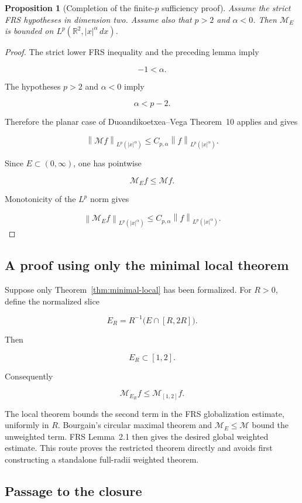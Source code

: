 \documentclass[11pt,a4paper]{article}
\newtheorem{proposition}[theorem]{Proposition}
\theoremstyle{definition}
\theoremstyle{remark}
\newcommand{\R}{\mathbb{R}}
\newcommand{\M}{\mathcal{M}}
\newcommand{\norm}[1]{\left\lVert #1\right\rVert}
\newcommand{\abs}[1]{\left\lvert #1\right\rvert}
\begin{document}
\begin{proposition}[Completion of the finite-$p$ sufficiency proof]\label{prop:high-p-branch}
Assume the strict FRS hypotheses in dimension two.  Assume also that
$p>2$ and $\alpha<0$.  Then $\M_E$ is bounded on
$L^p(\R^2,\abs{x}^{\alpha}\,dx)$.
\end{proposition}

\begin{proof}
The strict lower FRS inequality and the preceding lemma imply

\[
-1<\alpha.
\]

The hypotheses $p>2$ and $\alpha<0$ imply

\[
\alpha<p-2.
\]

Therefore the planar case of Duoandikoetxea--Vega Theorem~10 applies and gives

\[
\norm{\M f}_{L^p(\abs{x}^{\alpha})}
\leq C_{p,\alpha}\norm{f}_{L^p(\abs{x}^{\alpha})}.
\]

Since $E\subset(0,\infty)$, one has pointwise

\[
\M_E f\leq\M f.
\]

Monotonicity of the $L^p$ norm gives

\[
\norm{\M_E f}_{L^p(\abs{x}^{\alpha})}
\leq C_{p,\alpha}\norm{f}_{L^p(\abs{x}^{\alpha})}.
\]
\end{proof}

\subsection{A proof using only the minimal local theorem}

Suppose only Theorem~\ref{thm:minimal-local} has been formalized.  For $R>0$,
define the normalized slice

\[
E_R=R^{-1}\bigl(E\cap[R,2R]\bigr).
\]

Then

\[
E_R\subset[1,2].
\]

Consequently

\[
\M_{E_R}f\leq\M_{[1,2]}f.
\]

The local theorem bounds the second term in the FRS globalization estimate,
uniformly in $R$.  Bourgain's circular maximal theorem and
$\M_E\leq\M$ bound the unweighted term.  FRS Lemma~2.1 then gives the desired
global weighted estimate.  This route proves the restricted theorem directly
and avoids first constructing a standalone full-radii weighted theorem.

\subsection{Passage to the closure}
\end{document}
